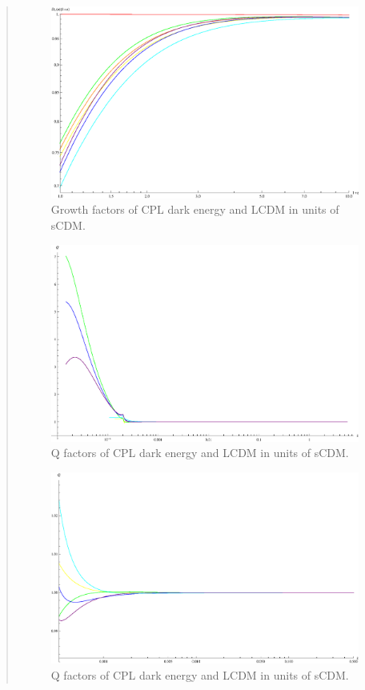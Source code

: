 \documentclass{article}
\begin{document}
\begin{quotation}
{\begin{enumerate}
\begin{figure}[!htpb]
\centering
\includegraphics[width=350pt]{CPL_Supp_GrowthFactors_Cut.eps}
\caption{\color{blue}Growth factors of CPL dark energy and LCDM in units of sCDM.}\label{fig:CPL_Supp_GrowthFactors_Cut}
\end{figure}




\begin{figure}[!htpb]
\centering
\includegraphics[width=350pt]{CPL_Supp_QFactors.eps}
\caption{\color{blue}Q factors of CPL dark energy and LCDM in units of sCDM.}\label{fig:CPL_Supp_QFactors}
\end{figure}


\begin{figure}[!htpb]
\centering
\includegraphics[width=350pt]{CPL_Supp_QFactors_Cut.eps}
\caption{\color{blue}Q factors of CPL dark energy and LCDM in units of sCDM.}\label{fig:CPL_Supp_QFactors_Cut}
\end{figure}


\end{enumerate}}
\end{quotation}
\end{document}
